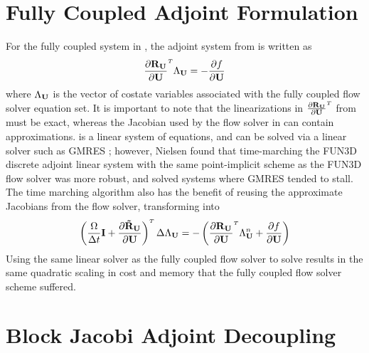 \section{Fully Coupled Adjoint Formulation}
\label{sec:fully-coupled-adj}

For the fully coupled system in , the adjoint system from
 is written as
\begin{equation}
  \rtdiff{\mU}{\mU} \adjlam{\mU} = - \pd{f}{\mU}
  \label{fc-adjoint-system}
\end{equation}
where $\Lambda_{\mathbf U}$ is the vector of costate variables associated with the
fully coupled flow solver equation set.  It is important to note that the
linearizations in $\rtdiff{\mU}{\mU}$ from  must be
exact, whereas the Jacobian used by the flow solver in 
can contain approximations.   is a linear system of
equations, and can be solved via a linear solver such as GMRES
\cite{saad1986gmres}; however, Nielsen \cite{nielsenPhD} found that
time-marching the FUN3D discrete adjoint linear system with the same
point-implicit scheme as the FUN3D flow solver was more robust, and solved
systems where GMRES tended to stall.  The time marching algorithm also has the
benefit of reusing the approximate Jacobians from the flow solver, transforming
 into
\begin{equation}
  \left(
    \frac{\vol}{\Delta t} \mi + \druduapprox
  \right)^{\mathsmaller T} \Delta \adjlam{\mU}
  =
  -\left(\pd{\ru{}}{\mU}^{\mathsmaller T}\adjlam{\mU}^n + \pd{f}{\mU} \right)
  \label{fc-adj-time}
\end{equation}
Using the same linear solver as the fully coupled flow solver to solve
 results in the same quadratic scaling in cost and memory that
the fully coupled flow solver scheme suffered.

\section{Block Jacobi Adjoint Decoupling}
\label{block-jacobi-decoupling}

